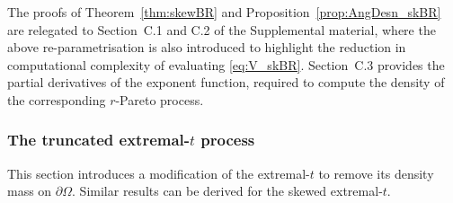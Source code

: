 \documentclass[12pt]{article}
\begin{document}
The proofs of Theorem~\ref{thm:skewBR} and Proposition~\ref{prop:AngDesn_skBR} are relegated to Section~C.1 and C.2 of the Supplemental material, where the above re-parametrisation is also introduced to highlight the reduction in computational complexity of evaluating \eqref{eq:V_skBR}. Section~C.3 provides the partial derivatives of the exponent function, required to compute the density of the corresponding $r$-Pareto process. 


\subsubsection{The truncated extremal-$t$ process}

This section 
introduces a modification of the  extremal-$t$ to remove its density mass on $\partial\Omega$.
Similar results can be derived for the skewed extremal-$t$.  
\end{document}

